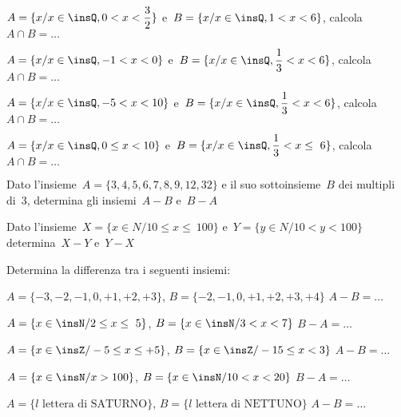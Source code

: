 \begin{esercizio}
\label{ese:7.48}
$A=\{x/x\in \insQ,0<x<\dfrac{3}{2}\}$ e~$B=\{x/x\in \insQ,1<x<6\}$, 
calcola~$A\cap B=\ldots$
\end{esercizio}

\begin{esercizio}
\label{ese:7.49}
$A=\{x/x\in \insQ,-1<x<0\}$ e~$B=\{x/x\in \insQ,\dfrac{1}{3}<x<6\}$, 
calcola~$A\cap B=\ldots$
\end{esercizio}

\begin{esercizio}
\label{ese:7.50}
$A=\{x/x\in \insQ,-5<x<10\}$ e~$B=\{x/x\in \insQ,\dfrac{1}{3}<x<6\}$, 
calcola~$A\cap B=\ldots$
\end{esercizio}

\begin{esercizio}
\label{ese:7.51}
$A=\{x/x\in \insQ,0\le x<10\}$ e~$B=\{x/x\in \insQ,\dfrac{1}{3}<x\le~6\}$, 
calcola~$A\cap B=\ldots$
\end{esercizio}

\begin{esercizio}
\label{ese:7.52}
Dato l'insieme~$A=\{3, 4, 5, 6, 7, 8, 9, 12, 32\}$ e il suo sottoinsieme~$B$ dei 
multipli di~3, determina gli
insiemi~$A-B$ e~$B-A$
\end{esercizio}

\begin{esercizio}
\label{ese:7.53}
Dato l'insieme~$X=\{x\in N/10\le x\le~100\}$ e~$Y=\{y\in N/10<y<100\}$ 
determina~$X-Y$ e~$Y-X$
\end{esercizio}

\begin{esercizio}
\label{ese:7.54}
Determina la differenza tra i seguenti insiemi:
\vspace{-6pt}
\begin{enumeratea}
 \item $A=\{-3,-2,-1,0,+1,+2,+3\}$, $B=\{-2,-1,0,+1,+2,+3,+4\}$ $A-B=\ldots$
\item $A=\{x\in\insN/2\le x\le~5\}$, $B=\{x\in\insN/3<x<7\}$ $B-A=\ldots$
\item $A=\{x\in\insZ/-5\le x\le +5\}$, $B=\{x\in\insZ/-15\le x<3\}$ $A-B=\ldots$
\item $A=\{x\in\insN/x>100\}$, $B=\{x\in \insN/10<x<20\}$ $B-A=\ldots$
\item $A=\{l\text{ lettera di SATURNO}\}$, $B=\{l\text{ lettera di NETTUNO}\}$ 
$A-B=\ldots$
\end{enumeratea}
\end{esercizio}

